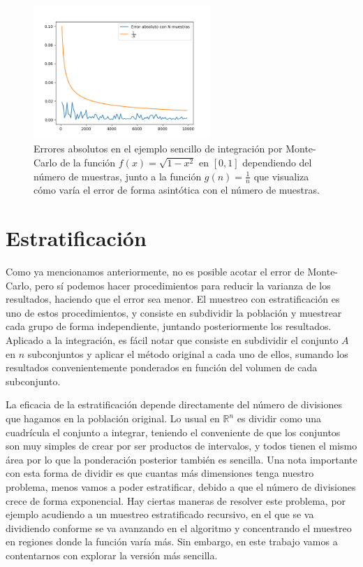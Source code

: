 \documentclass{scrbook}
\begin{document}
\begin{figure}[ht]
	\centering
	\includegraphics[width=0.6\textwidth]{error_mc_normal2}
	\caption{Errores absolutos en el ejemplo sencillo de integración por Monte-Carlo de la función $f(x) = \sqrt{1-x^2}$ en $[0,1]$ dependiendo del número de muestras, junto a la función $g(n) = \frac{1}{n}$ que visualiza cómo varía el error de forma asintótica con el número de muestras.}
	\label{fig:montEx}
\end{figure}
\section{Estratificación}
\label{estratif}
Como ya mencionamos anteriormente, no es posible acotar el error de Monte-Carlo, pero sí podemos hacer procedimientos para reducir la varianza de los resultados, haciendo que el error sea menor. El muestreo con estratificación es uno de estos procedimientos, y consiste en subdividir la población y muestrear cada grupo de forma independiente, juntando posteriormente los resultados. Aplicado a la integración, es fácil notar que consiste en subdividir el conjunto $A$ en $n$ subconjuntos y aplicar el método original a cada uno de ellos, sumando los resultados convenientemente ponderados en función del volumen de cada subconjunto.

La eficacia de la estratificación depende directamente del número de divisiones que hagamos en la población original. Lo usual en $\mathds{R}^n$ es dividir como una cuadrícula el conjunto a integrar, teniendo el conveniente de que los conjuntos son muy simples de crear por ser productos de intervalos, y todos tienen el mismo área por lo que la ponderación posterior también es sencilla. Una nota importante con esta forma de dividir es que cuantas más dimensiones tenga nuestro problema, menos vamos a poder estratificar, debido a que el número de divisiones crece de forma exponencial. Hay ciertas maneras de resolver este problema, por ejemplo acudiendo a un muestreo estratificado recursivo, en el que se va dividiendo conforme se va avanzando en el algoritmo y concentrando el muestreo en regiones donde la función varía más. Sin embargo, en este trabajo vamos a contentarnos con explorar la versión más sencilla.
\end{document}
